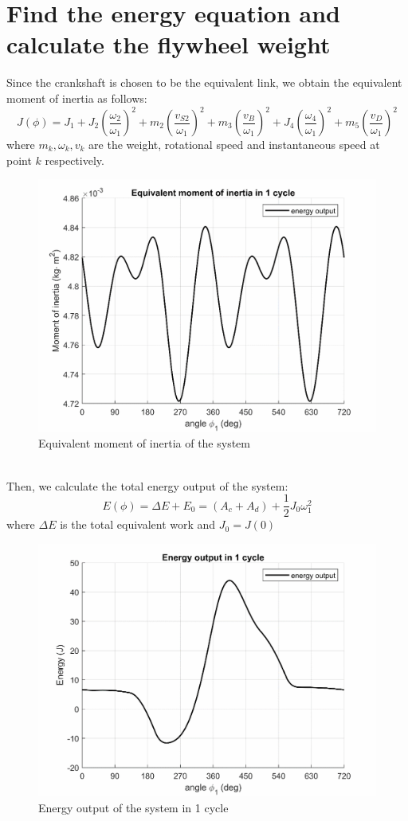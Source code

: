 \section{Find the energy equation and  calculate the flywheel weight}
Since the crankshaft is chosen to be the equivalent link, we obtain the equivalent moment of inertia as follows:
\begin{equation}
	J(\phi)=J_1+J_2\left(\dfrac{\omega_2}{\omega_1}\right)^2+m_2\left(\dfrac{v_{S2}}{\omega_1}\right)^2+m_3\left(\dfrac{v_{B}}{\omega_1}\right)^2+J_4\left(\dfrac{\omega_4}{\omega_1}\right)^2+m_5\left(\dfrac{v_{D}}{\omega_1}\right)^2
\end{equation}
where $ m_k,\omega_k,v_k $ are the weight, rotational speed and instantaneous speed at point $ k $ respectively.
\begin{figure}[h]
	\centering
	\includegraphics[width=0.6\linewidth]{19}
	\caption{Equivalent moment of inertia of the system}
	\label{fig:19}
\end{figure}\\
Then, we calculate the total energy output of the system:
\begin{equation}
	E(\phi)=\Delta E + E_0 = (A_c+A_d) + \dfrac{1}{2}J_0\omega_1^2
\end{equation}
where $ \Delta E $ is the total equivalent work and $ J_0 = J(0)$
\begin{figure}
	\centering
	\includegraphics[width=0.6\linewidth]{20}
	\caption{Energy output of the system in 1 cycle}
	\label{fig:20}
\end{figure}\\
